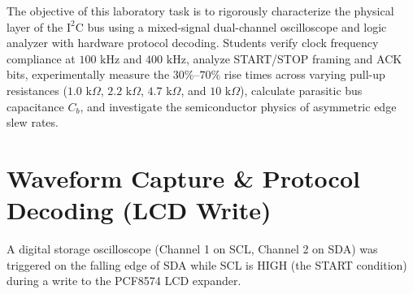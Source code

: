 \documentclass[11pt,a4paper]{article}
\begin{document}

\begin{objectivebox}
The objective of this laboratory task is to rigorously characterize the physical layer of the $\text{I}^2\text{C}$ bus using a mixed-signal dual-channel oscilloscope and logic analyzer with hardware protocol decoding. Students verify clock frequency compliance at $100\text{ kHz}$ and $400\text{ kHz}$, analyze START/STOP framing and ACK bits, experimentally measure the $30\%\text{--}70\%$ rise times across varying pull-up resistances ($1.0\text{ k}\Omega$, $2.2\text{ k}\Omega$, $4.7\text{ k}\Omega$, and $10\text{ k}\Omega$), calculate parasitic bus capacitance $C_b$, and investigate the semiconductor physics of asymmetric edge slew rates.
\end{objectivebox}

\section{Waveform Capture \& Protocol Decoding (LCD Write)}
A digital storage oscilloscope (Channel 1 on SCL, Channel 2 on SDA) was triggered on the falling edge of SDA while SCL is HIGH (the START condition) during a write to the PCF8574 LCD expander.
\end{document}
